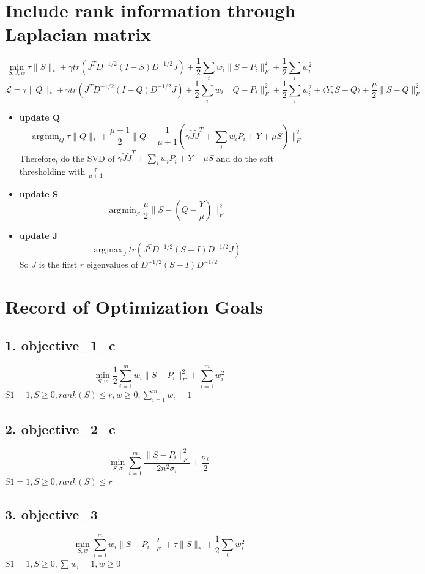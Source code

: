 \documentclass[11pt]{article}
\DeclareMathOperator*{\argmin}{\arg\!\min}
\DeclareMathOperator*{\argmax}{\arg\!\max}
\begin{document}
\section*{Include rank information through Laplacian matrix}
$$\min_{S, J, w} \tau \|S\|_* + \gamma tr(J^T D^{-1/2} (I-S) D^{-1/2} J) + \frac{1}{2} \sum_i w_i \|S-P_i\|_F^2 + \frac{1}{2} \sum_i w_i^2$$
$$\mathcal{L}= \tau \|Q\|_* + \gamma tr(J^T D^{-1/2} (I-Q)D^{-1/2} J) + \frac{1}{2} \sum_i w_i \|Q-P_i\|_F^2 + \frac{1}{2} \sum_i w_i^2 + \langle Y, S-Q \rangle + \frac{\mu}{2} \|S-Q\|_F^2$$
\begin{itemize}
\item \textbf{update Q}
$$\argmin_Q \tau \|Q\|_* + \frac{\mu+1}{2} \|Q - \frac{1}{\mu+1} (\gamma \tilde{J} \tilde{J}^T + \sum_i w_i P_i + Y + \mu S) \|_F^2$$
Therefore, do the SVD of $\gamma \tilde{J} \tilde{J}^T + \sum_i w_i P_i + Y + \mu S$ and do the soft thresholding with $\frac{\tau}{\mu+1}$
\item \textbf{update S}
$$\argmin_S \frac{\mu}{2} \|S - (Q-\frac{Y}{\mu})\|_F^2$$
\item \textbf{update J}
$$\argmax_J tr(J^T D^{-1/2} (S-I) D^{-1/2} J)$$
So $J$ is the first $r$ eigenvalues of $D^{-1/2}(S-I) D^{-1/2}$

\end{itemize}


\clearpage

\section*{Record of Optimization Goals}
\subsection*{1. objective\_1\_c}
$$\min_{S,w} \frac{1}{2} \sum_{i=1}^{m} w_i \|S-P_i\|_F^2 + \sum_{i=1}^{m} w_i^2$$
$S1 = 1, S \geq 0, rank(S) \leq r, w \geq 0, \sum_{i=1}^{m} w_i = 1$
\subsection*{2. objective\_2\_c}
$$\min_{S,\sigma} \sum_{i=1}^{m} \frac{\|S-P_i\|_F^2}{2n^2 \sigma_i} + \frac{\sigma_i}{2}$$
$S1 = 1, S\geq 0, rank(S) \leq r$
\subsection*{3. objective\_3}
$$\min_{S,w} \sum_{i=1}^{m} w_i \|S-P_i\|_F^2 + \tau \|S\|_* + \frac{1}{2} \sum_i w_i^2$$
$S1 = 1, S\geq 0, \sum w_i = 1, w \geq 0$
\end{document}
